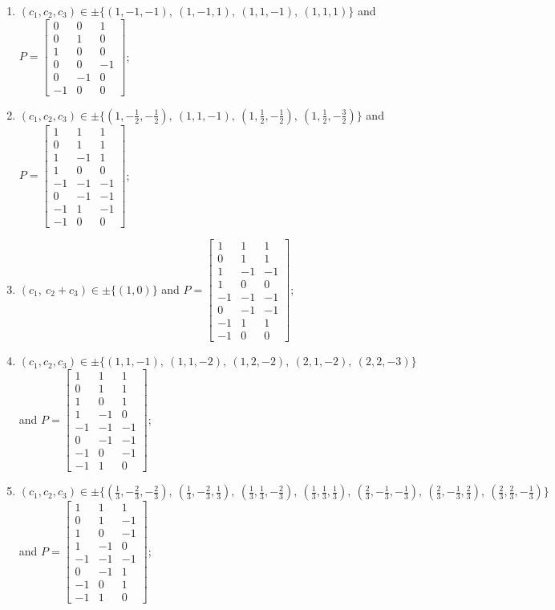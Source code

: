 \begin{enumerate}
\item[(d26)] $(c_1,c_2,c_3)\in \pm\{(1,-1,-1),\allowbreak\ (1,-1,1),\allowbreak\ (1,1,-1),\allowbreak\ (1,1,1)\}$ and $P=\begin{bmatrix}0&0&1\\0&1&0\\1&0&0\\0&0&-1\\0&-1&0\\-1&0&0\end{bmatrix}$;
\item[(d27)\,\newitem] $(c_1,c_2,c_3)\in \pm\{(1,-\tfrac{1}{2},-\tfrac{1}{2}),\allowbreak\ (1,1,-1),\allowbreak\ (1,\tfrac{1}{2},-\tfrac{1}{2}),\allowbreak\ (1,\tfrac{1}{2},-\tfrac{3}{2})\}$ and $P=\begin{bmatrix}1&1&1\\0&1&1\\1&-1&1\\1&0&0\\-1&-1&-1\\0&-1&-1\\-1&1&-1\\-1&0&0\end{bmatrix}$;
\item[(d28)] $(c_1,\ c_2+c_3)\in \pm\{(1,0)\}$ and $P=\begin{bmatrix}1&1&1\\0&1&1\\1&-1&-1\\1&0&0\\-1&-1&-1\\0&-1&-1\\-1&1&1\\-1&0&0\end{bmatrix}$;
\item[(d29)] $(c_1,c_2,c_3)\in \pm\{(1,1,-1),\allowbreak\ (1,1,-2),\allowbreak\ (1,2,-2),\allowbreak\ (2,1,-2),\allowbreak\ (2,2,-3)\}$ and $P=\begin{bmatrix}1&1&1\\0&1&1\\1&0&1\\1&-1&0\\-1&-1&-1\\0&-1&-1\\-1&0&-1\\-1&1&0\end{bmatrix}$;
\item[(d30)\,\newitem] $(c_1,c_2,c_3)\in \pm\{(\tfrac{1}{3},-\tfrac{2}{3},-\tfrac{2}{3}),\allowbreak\ (\tfrac{1}{3},-\tfrac{2}{3},\tfrac{1}{3}),\allowbreak\ (\tfrac{1}{3},\tfrac{1}{3},-\tfrac{2}{3}),\allowbreak\ (\tfrac{1}{3},\tfrac{1}{3},\tfrac{1}{3}),\allowbreak\ (\tfrac{2}{3},-\tfrac{1}{3},-\tfrac{1}{3}),\allowbreak\ (\tfrac{2}{3},-\tfrac{1}{3},\tfrac{2}{3}),\allowbreak\ (\tfrac{2}{3},\tfrac{2}{3},-\tfrac{1}{3})\}$ and $P=\begin{bmatrix}1&1&1\\0&1&-1\\1&0&-1\\1&-1&0\\-1&-1&-1\\0&-1&1\\-1&0&1\\-1&1&0\end{bmatrix}$;

\end{enumerate}
